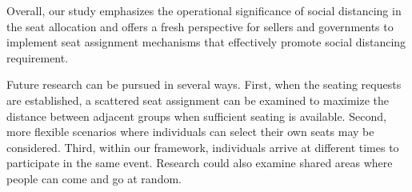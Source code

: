 

Overall, our study emphasizes the operational significance of social distancing in the seat allocation and offers a fresh perspective for sellers and governments to implement seat assignment mechanisms that effectively promote social distancing requirement.



Future research can be pursued in several ways. First, when the seating requests are established, a scattered seat assignment can be examined to maximize the distance between adjacent groups when sufficient seating is available. Second, more flexible scenarios where individuals can select their own seats may be considered. Third, within our framework, individuals arrive at different times to participate in the same event. Research could also examine shared areas where people can come and go at random.


